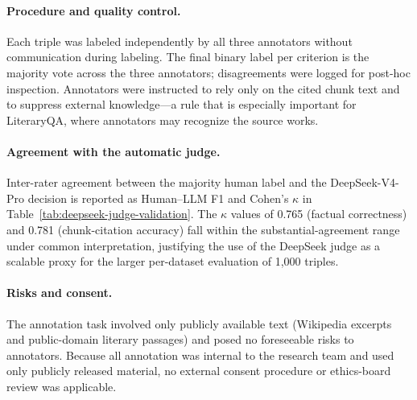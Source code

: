 \documentclass[11pt]{article}
\begin{document}
\paragraph{Procedure and quality control.}
Each triple was labeled independently by all three annotators without communication during labeling. The final binary label per criterion is the majority vote across the three annotators; disagreements were logged for post-hoc inspection. Annotators were instructed to rely only on the cited chunk text and to suppress external knowledge---a rule that is especially important for LiteraryQA, where annotators may recognize the source works.

\paragraph{Agreement with the automatic judge.}
Inter-rater agreement between the majority human label and the DeepSeek-V4-Pro decision is reported as Human--LLM F1 and Cohen's $\kappa$ in Table~\ref{tab:deepseek-judge-validation}. The $\kappa$ values of 0.765 (factual correctness) and 0.781 (chunk-citation accuracy) fall within the substantial-agreement range under common interpretation, justifying the use of the DeepSeek judge as a scalable proxy for the larger per-dataset evaluation of 1{,}000 triples.

\paragraph{Risks and consent.}
The annotation task involved only publicly available text (Wikipedia excerpts and public-domain literary passages) and posed no foreseeable risks to annotators. Because all annotation was internal to the research team and used only publicly released material, no external consent procedure or ethics-board review was applicable.
\end{document}
